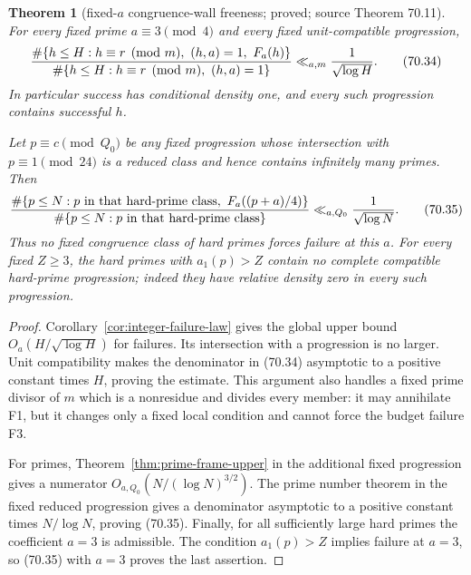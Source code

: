 \documentclass[10pt,reqno]{amsart}
\newtheorem{theorem}{Theorem}[section]
\theoremstyle{definition}
\newcommand{\1}{\mathbf 1}
\begin{document}
\begin{theorem}[fixed-$a$ congruence-wall freeness; proved; source Theorem 70.11]\label{thm:congruence-wall-free}  For every
fixed prime $a\equiv3\pmod4$ and every fixed unit-compatible progression,
\begin{equation}
 {\#\{h\leq H:h\equiv r\pmod m,\ (h,a)=1,\ F_a(h)\}
  \over
  \#\{h\leq H:h\equiv r\pmod m,\ (h,a)=1\}}
       \ll_{a,m}{1\over\sqrt{\log H}}.                   \tag{70.34}
\end{equation}
In particular success has conditional density one, and every such
progression contains successful $h$.

Let $p\equiv c\pmod Q_0$ be any fixed progression whose intersection with
$p\equiv1\pmod {24}$ is a reduced class and hence contains infinitely
many primes.  Then
\begin{equation}
 {\#\{p\leq N:p\text{ in that hard-prime class},\
          F_a((p+a)/4)\}
  \over
  \#\{p\leq N:p\text{ in that hard-prime class}\}}
       \ll_{a,Q_0}{1\over\sqrt{\log N}}.                 \tag{70.35}
\end{equation}
Thus no fixed congruence class of hard primes forces failure at this
$a$.  For every fixed $Z\geq3$, the hard primes with $a_1(p)>Z$
contain no complete compatible hard-prime progression; indeed they have
relative density zero in every such progression.

\end{theorem}
\begin{proof} Corollary~\ref{cor:integer-failure-law} gives the global upper bound
$O_a(H/\sqrt{\log H})$ for failures.  Its intersection with a progression
is no larger.  Unit compatibility makes the denominator in (70.34)
asymptotic to a positive constant times $H$, proving the estimate.  This
argument also handles a fixed prime divisor of $m$ which is a nonresidue
and divides every member: it may annihilate F1, but it changes only a fixed
local condition and cannot force the budget failure F3.

For primes, Theorem~\ref{thm:prime-frame-upper} in the additional fixed progression gives a
numerator $O_{a,Q_0}(N/(\log N)^{3/2})$.  The prime number theorem in the
fixed reduced progression gives a denominator asymptotic to a positive
constant times $N/\log N$, proving (70.35).  Finally, for all sufficiently
large hard primes the coefficient $a=3$ is admissible.  The condition
$a_1(p)>Z$ implies failure at $a=3$, so (70.35) with $a=3$ proves the
last assertion.
\end{proof}
\end{document}
